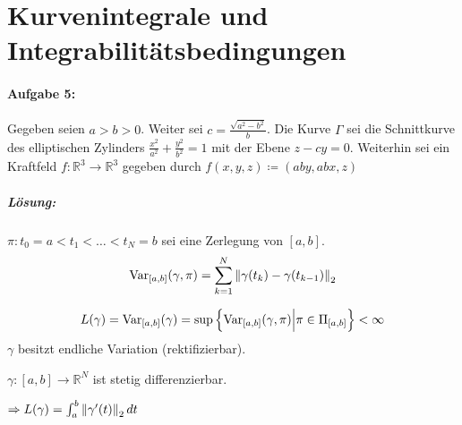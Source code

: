 \documentclass{scrreprt}
\begin{document}
\section*{Kurvenintegrale und Integrabilitätsbedingungen}
\paragraph{Aufgabe 5:} Gegeben seien $a > b > 0$.
Weiter sei $c = \frac{\sqrt{a^2 - b^2}}{b}$.
Die Kurve $\Gamma$ sei die Schnittkurve des elliptischen Zylinders
$\frac{x^2}{a^2} + \frac{y^2}{b^2} = 1$ mit der Ebene $z - c y = 0$.
Weiterhin sei ein Kraftfeld $f \colon \mathbb{R}^3 \to \mathbb{R}^3$ gegeben
durch $f(x, y, z) \coloneqq (aby, abx, z)$
\subparagraph{Lösung:} $\pi \colon t_0 = a < t_1 < \ldots < t_N = b$
  sei eine Zerlegung von $[a, b]$.
  \[
    \text{Var}_{[a, b]}(\gamma, \pi) = \sum_{k = 1}^N\norm{\gamma(t_k) - \gamma(t_{k - 1})}_2
  \]
  \begin{center}
  \end{center}
  \[
    L(\gamma) = \text{Var}_{[a, b]}(\gamma) = \sup\qty{\text{Var}_{[a, b]}(\gamma, \pi) {\Big |} \pi \in \Pi_{[a, b]}} < \infty
  \]
  $\gamma$ besitzt endliche Variation (rektifizierbar).

  $\gamma \colon [a, b] \to \mathbb{R}^N$ ist stetig differenzierbar.

  $\Rightarrow L(\gamma) = \int_a^b \norm{\gamma'(t)}_2 \,dt$
\end{document}
